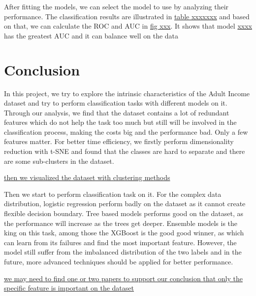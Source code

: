 \documentclass{article}
\begin{document}


After fitting the models, we can select the model to use by analyzing their performance. The classification results are illustrated in \underline{table xxxxxxx} and based on that, we can calculate the ROC and AUC in \underline{fig xxx}. It shows that model \underline{xxxx} has the greatest AUC and it can balance well on the data


\section{Conclusion}

In this project, we try to explore the intrinsic characteristics of the Adult Income dataset and try to perform classification tasks with different models on it. Through our analysis, we find that the dataset contains a lot of redundant features which do not help the task too much but still will be involved in the classification process, making the costs big and the performance bad. Only a few features matter. For better time efficiency, we firstly perform dimensionality reduction
with t-SNE and found that the classes are hard to separate and there are some sub-clusters in the dataset. 

\underline{then we visualized the dataset with clustering methods}

Then we start to perform classification task on it. For the complex data distribution, logistic regression perform badly on the dataset as it cannot create flexible decision boundary. Tree based models performs good on the dataset, as the performance will increase as the trees get deeper. Ensemble models is the king on this task, among those the XGBoost is the good good winner, as which can learn from its failures and find the most important feature. However, the model still suffer from the
imbalanced distribution of the two labels and in the future, more advanced techniques should be applied for better performance.

\underline{we may need to find one or two papers to support our conclusion that only the specific feature is important on the dataset}





\label{conclusion}
\end{document}

